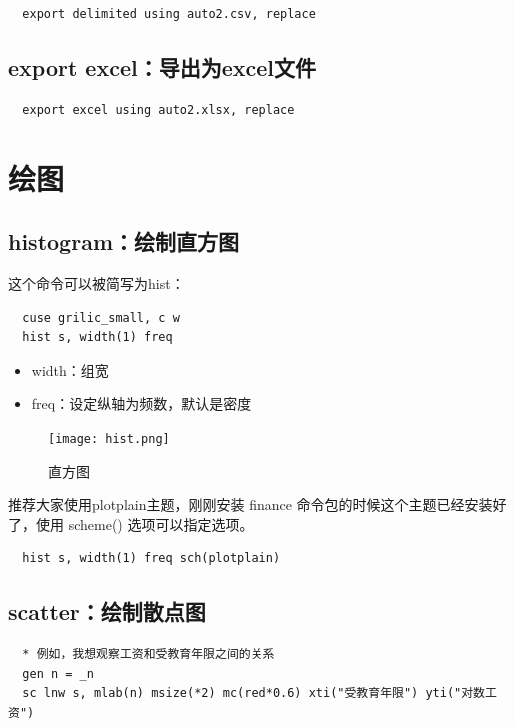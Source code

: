 \documentclass[cn,fancy,blue,11pt]{elegantbook}
\begin{document}
\begin{lstlisting}
  export delimited using auto2.csv, replace
\end{lstlisting}

\subsection{export excel：导出为excel文件}

\begin{lstlisting}
  export excel using auto2.xlsx, replace
\end{lstlisting}

\section{绘图}
\subsection{histogram：绘制直方图}

这个命令可以被简写为hist：

\begin{lstlisting}
  cuse grilic_small, c w
  hist s, width(1) freq
\end{lstlisting}

\begin{itemize}
  \item  width：组宽
  \item  freq：设定纵轴为频数，默认是密度
\end{itemize}

\begin{figure}[htbp]
  \centering
  \texttt{[image: hist.png]}
  \caption{直方图}
  \label{fig:hist}
\end{figure}

\begin{remark}
  推荐大家使用plotplain主题，刚刚安装 finance 命令包的时候这个主题已经安装好了，使用 scheme() 选项可以指定选项。
\end{remark}

\begin{lstlisting}
  hist s, width(1) freq sch(plotplain)
\end{lstlisting}

\subsection{scatter：绘制散点图}

\begin{lstlisting}
  * 例如，我想观察工资和受教育年限之间的关系
  gen n = _n
  sc lnw s, mlab(n) msize(*2) mc(red*0.6) xti("受教育年限") yti("对数工资")
\end{lstlisting}
\end{document}
